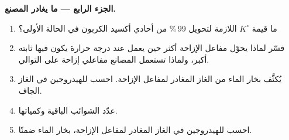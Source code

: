 \begin{problem}
\medskip
\noindent\textbf{الجزء الرابع --- ما يغادر المصنع.}
\begin{enumerate}[resume]
  \item ما قيمة $K^\circ$ اللازمة لتحويل 99\,\% من
        أحادي أكسيد الكربون في الحالة الأولى؟
  \item فسّر لماذا يحوّل مفاعل الإزاحة أكثر حين يعمل عند
        درجة حرارة يكون فيها ثابته أكبر، ولماذا تستعمل المصانع مفاعلي
        إزاحة على التوالي.
  \item يُكثَّف بخار الماء من الغاز المغادر لمفاعل الإزاحة.
        احسب  للهيدروجين في الغاز الجاف.
  \item عدّد الشوائب الباقية وكمياتها.
  \item احسب  للهيدروجين في الغاز المغادر لمفاعل
        الإزاحة، بخار الماء ضمنًا.
\end{enumerate}
\end{problem}

